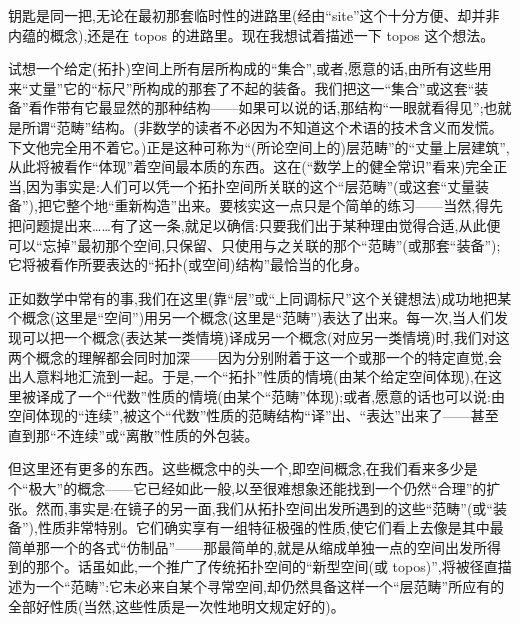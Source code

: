 钥匙是同一把,无论在最初那套临时性的进路里(经由“site”这个十分方便、却并非内蕴的概念),还是在 topos 的进路里。现在我想试着描述一下 topos 这个想法。

试想一个给定(拓扑)空间上所有层所构成的“集合”,或者,愿意的话,由所有这些用来“丈量”它的“标尺”所构成的那套了不起的装备。我们把这一“集合”或这套“装备”看作带有它最显然的那种结构——如果可以说的话,那结构“一眼就看得见”;也就是所谓“范畴”结构。(非数学的读者不必因为不知道这个术语的技术含义而发慌。下文他完全用不着它。)正是这种可称为“(所论空间上的)层范畴”的“丈量上层建筑”,从此将被看作“体现”着空间最本质的东西。这在(“数学上的健全常识”看来)完全正当,因为事实是:人们可以凭一个拓扑空间所关联的这个“层范畴”(或这套“丈量装备”),把它整个地“重新构造”出来。要核实这一点只是个简单的练习——当然,得先把问题提出来……有了这一条,就足以确信:只要我们出于某种理由觉得合适,从此便可以“忘掉”最初那个空间,只保留、只使用与之关联的那个“范畴”(或那套“装备”);它将被看作所要表达的“拓扑(或空间)结构”最恰当的化身。

正如数学中常有的事,我们在这里(靠“层”或“上同调标尺”这个关键想法)成功地把某个概念(这里是“空间”)用另一个概念(这里是“范畴”)表达了出来。每一次,当人们发现可以把一个概念(表达某一类情境)译成另一个概念(对应另一类情境)时,我们对这两个概念的理解都会同时加深——因为分别附着于这一个或那一个的特定直觉,会出人意料地汇流到一起。于是,一个“拓扑”性质的情境(由某个给定空间体现),在这里被译成了一个“代数”性质的情境(由某个“范畴”体现);或者,愿意的话也可以说:由空间体现的“连续”,被这个“代数”性质的范畴结构“译”出、“表达”出来了——甚至直到那“不连续”或“离散”性质的外包装。

但这里还有更多的东西。这些概念中的头一个,即空间概念,在我们看来多少是个“极大”的概念——它已经如此一般,以至很难想象还能找到一个仍然“合理”的扩张。然而,事实是:在镜子的另一面,我们从拓扑空间出发所遇到的这些“范畴”(或“装备”),性质非常特别。它们确实享有一组特征极强的性质,使它们看上去像是其中最简单那一个的各式“仿制品”——那最简单的,就是从缩成单独一点的空间出发所得到的那个。话虽如此,一个推广了传统拓扑空间的“新型空间(或 topos)”,将被径直描述为一个“范畴”:它未必来自某个寻常空间,却仍然具备这样一个“层范畴”所应有的全部好性质(当然,这些性质是一次性地明文规定好的)。

